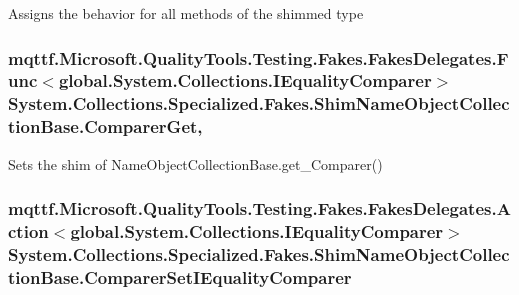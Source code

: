 Assigns the behavior for all methods of the shimmed type

\hypertarget{class_system_1_1_collections_1_1_specialized_1_1_fakes_1_1_shim_name_object_collection_base_a39fefaf63efcc22e04b8afa7cefcd056}{
\subsubsection[{Comparer\-Get}]{\setlength{\rightskip}{0pt plus 5cm}mqttf.\-Microsoft.\-Quality\-Tools.\-Testing.\-Fakes.\-Fakes\-Delegates.\-Func$<$global.\-System.\-Collections.\-I\-Equality\-Comparer$>$ System.\-Collections.\-Specialized.\-Fakes.\-Shim\-Name\-Object\-Collection\-Base.\-Comparer\-Get\hspace{0.3cm}{\ttfamily [get]}, {\ttfamily [set]}}}\label{class_system_1_1_collections_1_1_specialized_1_1_fakes_1_1_shim_name_object_collection_base_a39fefaf63efcc22e04b8afa7cefcd056}


Sets the shim of Name\-Object\-Collection\-Base.\-get\-\_\-\-Comparer()

\hypertarget{class_system_1_1_collections_1_1_specialized_1_1_fakes_1_1_shim_name_object_collection_base_a107b52a46ec2aed3731b1287827112f7}{
\subsubsection[{Comparer\-Set\-I\-Equality\-Comparer}]{\setlength{\rightskip}{0pt plus 5cm}mqttf.\-Microsoft.\-Quality\-Tools.\-Testing.\-Fakes.\-Fakes\-Delegates.\-Action$<$global.\-System.\-Collections.\-I\-Equality\-Comparer$>$ System.\-Collections.\-Specialized.\-Fakes.\-Shim\-Name\-Object\-Collection\-Base.\-Comparer\-Set\-I\-Equality\-Comparer\hspace{0.3cm}{\ttfamily [set]}}}\label{class_system_1_1_collections_1_1_specialized_1_1_fakes_1_1_shim_name_object_collection_base_a107b52a46ec2aed3731b1287827112f7}


